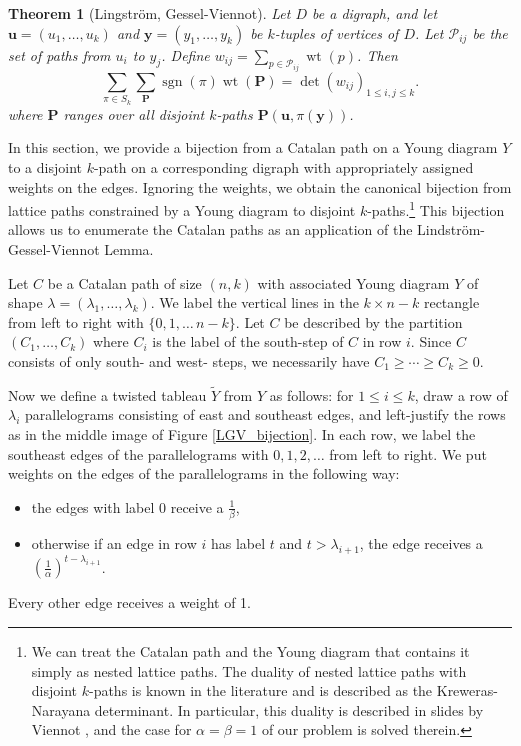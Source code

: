 \documentclass[11pt]{article}
\numberwithin{equation}{section}
\theoremstyle{plain}
\newtheorem{thm}{Theorem}[section]
\theoremstyle{definition}
\theoremstyle{remark}
\DeclareMathOperator{\wt}{wt}
\DeclareMathOperator{\sgn}{sgn}
\begin{document}
\begin{thm}[Lingstr\"{o}m, Gessel-Viennot]\label{LGV}
Let $D$ be a digraph, and let $\textbf{u}=(u_1,\ldots,u_k)$ and $\textbf{y}=(y_1,\ldots,y_k)$ be $k$-tuples of vertices of $D$. Let $\mathcal{P}_{ij}$ be the set of paths from $u_i$ to $y_j$. Define $w_{ij}=\sum_{p \in \mathcal{P}_{ij}} \wt(p)$. Then
\[
\sum_{\pi \in S_k} \sum_\textbf{P} \sgn(\pi) \wt(\textbf{P}) = \det \left( w_{ij} \right)_{1 \leq i,j \leq k}.
\]
where $\textbf{P}$ ranges over all disjoint $k$-paths $\textbf{P}(\textbf{u},\pi(\textbf{y}))$.
\end{thm}

In this section, we provide a bijection from a Catalan path on a Young diagram $Y$ to a disjoint $k$-path on a corresponding digraph with appropriately assigned weights on the edges. Ignoring the weights, we obtain the canonical bijection from lattice paths constrained by a Young diagram to disjoint $k$-paths.\footnote{We can treat the Catalan path and the Young diagram that contains it simply as nested lattice paths. The duality of nested lattice paths with disjoint $k$-paths is known in the literature and is described as the Kreweras-Narayana determinant. In particular, this duality is described in slides by Viennot \cite{slides2}, and the case for $\alpha=\beta=1$ of our problem is solved therein.} 
This bijection allows us to enumerate the Catalan paths as an application of the Lindstr\"{o}m-Gessel-Viennot Lemma.
 


Let $C$ be a Catalan path of size $(n,k)$ with associated Young diagram $Y$ of shape $\lambda=(\lambda_1,\ldots,\lambda_k)$. We label the vertical lines in the $k \times n-k$ rectangle from left to right with $\{0,1,\ldots\,n-k\}$. Let $C$ be described by the partition $(C_1,\ldots,C_k)$ where $C_i$ is the label of the south-step of $C$ in row $i$. Since $C$ consists of only south- and west- steps, we necessarily have $C_1 \geq \cdots \geq C_k \geq 0$. 


Now we define a twisted tableau $\tilde{Y}$ from $Y$ as follows: for $1 \leq i \leq k$, draw a row of $\lambda_i$ parallelograms consisting of east and southeast edges, and left-justify the rows as in the middle image of Figure \ref{LGV_bijection}. In each row, we label the southeast edges of the parallelograms with $0,1,2,\ldots$ from left to right. We put weights on the edges of the parallelograms in the following way: 
\begin{itemize}
\item the edges with label 0 receive a $\frac{1}{\beta}$,
\item otherwise if an edge in row $i$ has label $t$ and $t>\lambda_{i+1}$, the edge receives a $\left(\frac{1}{\alpha}\right)^{t-\lambda_{i+1}}$.
\end{itemize}
Every other edge receives a weight of 1. 
\end{document}
